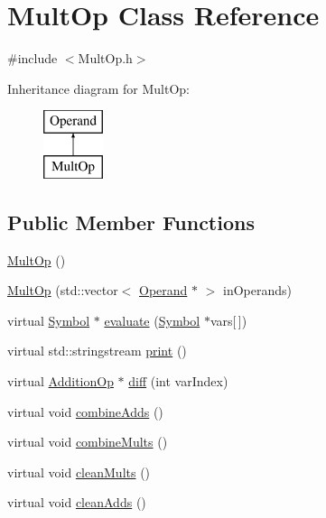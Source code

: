 \hypertarget{class_mult_op}{\section{Mult\+Op Class Reference}
\label{class_mult_op}
}


{\ttfamily \#include $<$Mult\+Op.\+h$>$}

Inheritance diagram for Mult\+Op\+:\begin{figure}[H]
\begin{center}
\leavevmode
\includegraphics[height=2.000000cm]{class_mult_op}
\end{center}
\end{figure}
\subsection*{Public Member Functions}
\begin{DoxyCompactItemize}
\item 
\hyperlink{class_mult_op_ae0ea2e5997a3cac068c00143680cbb6f}{Mult\+Op} ()
\item 
\hyperlink{class_mult_op_a18a1a7a3d5c65ab3a994d400002610d1}{Mult\+Op} (std\+::vector$<$ \hyperlink{class_operand}{Operand} $\ast$ $>$ in\+Operands)
\item 
virtual \hyperlink{class_symbol}{Symbol} $\ast$ \hyperlink{class_mult_op_ae25e9a6e8e71dab26b15513f8de6a36a}{evaluate} (\hyperlink{class_symbol}{Symbol} $\ast$vars\mbox{[}$\,$\mbox{]})
\item 
virtual std\+::stringstream \hyperlink{class_mult_op_ab08cb5ca6f8ad57596160a98a79f88ae}{print} ()
\item 
virtual \hyperlink{class_addition_op}{Addition\+Op} $\ast$ \hyperlink{class_mult_op_a37b0fd3f963181f326272b7c8de9d86c}{diff} (int var\+Index)
\item 
virtual void \hyperlink{class_mult_op_ae2c71f6cacdf19f30adc3dbb53f54c28}{combine\+Adds} ()
\item 
virtual void \hyperlink{class_mult_op_a53528db5222b6e7d0aa985c0a40e6e6c}{combine\+Mults} ()
\item 
virtual void \hyperlink{class_mult_op_aa46a75fb04c6a595eda8fb3f5d1dc15c}{clean\+Mults} ()
\item 
virtual void \hyperlink{class_mult_op_a84302f5059650d7eb78bb64fe07e4f9d}{clean\+Adds} ()
\end{DoxyCompactItemize}
